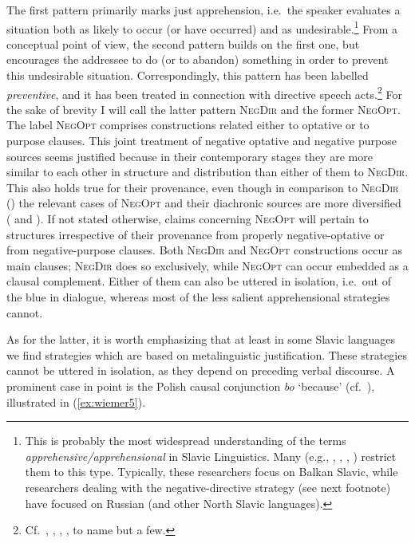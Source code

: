 \documentclass[output=paper,colorlinks,citecolor=brown]{langscibook}
\begin{document}
 The first pattern primarily marks just apprehension, i.e.\ the speaker evaluates a situation both as likely to occur (or have occurred) and as undesirable.\footnote{This is probably the most widespread understanding of the terms \textit{apprehensive/apprehensional} in Slavic Linguistics. Many (e.g., \citealt{Ivanova2014}, \citealt{Mitkovska2015}, \citealt{Bužarovska2017}, \citealt{MitkovskaEtAl2017}) restrict them to this type. Typically, these researchers focus on Balkan Slavic, while researchers dealing with the negative-directive strategy (see next footnote) have focused on Russian (and other North Slavic languages).} From a conceptual point of view, the second pattern builds on the first one, but encourages the addressee to do (or to abandon) something in order to prevent this undesirable situation. Correspondingly, this pattern has been labelled \textit{preventive}, and it has been treated in connection with directive speech acts.\footnote{Cf.\ \citet{Laskowski1998}, \citet{Xrakovskij2001}, \citet{Nilsson2012,Nilsson2013},  \citet{Kissine2014}, to name but a few.} For the sake of brevity I will call the latter pattern \textsc{NegDir} and the former \textsc{NegOpt}. The label \textsc{NegOpt} comprises constructions related either to optative or to purpose clauses. This joint treatment of negative optative and negative purpose sources seems justified because in their contemporary stages they are more similar to each other in structure and distribution than either of them to \textsc{NegDir}. This also holds true for their provenance, even though in comparison to \textsc{NegDir} () the relevant cases of \textsc{NegOpt} and their diachronic sources are more diversified ( and ). If not stated otherwise, claims concerning \textsc{NegOpt} will pertain to structures irrespective of their provenance from properly negative-optative or from negative-purpose clauses. Both \textsc{NegDir} and \textsc{NegOpt} constructions occur as main clauses; \textsc{NegDir} does so exclusively, while \textsc{NegOpt} can occur embedded as a clausal complement. Either of them can also be uttered in isolation, i.e.\ out of the blue in dialogue, whereas most of the less salient apprehensional strategies cannot.


As for the latter, it is worth emphasizing that at least in some Slavic languages we find strategies which are based on metalinguistic justification. These strategies cannot be uttered in isolation, as they depend on preceding verbal discourse. A prominent case in point is the Polish causal conjunction \textit{bo} `because' (cf.\ \citealt{Kawka1988}), illustrated in (\ref{ex:wiemer5}).
\end{document}
